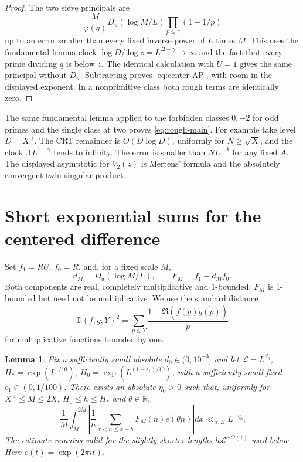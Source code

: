 \documentclass[11pt]{article}
\newtheorem{lemma}[theorem]{Lemma}
\theoremstyle{remark}\newtheorem{remark}[theorem]{Remark}
\newcommand{\calL}{\mathcal L}
\newcommand{\dist}{\mathbb D}
\begin{document}
\begin{proof}
The two sieve principals are
\[
 \frac{M}{\varphi(q)}D_u(\log M/L)
       \prod_{p\le z}(1-1/p)
\]
up to an error smaller than every fixed inverse power of $L$ times $M$.
This uses the fundamental-lemma clock
$\log D/\log z=L^{.2-\gamma}\to\infty$ and the fact that every prime
dividing $q$ is below $z$. The identical calculation with $U=1$ gives
the same principal without $D_u$. Subtracting proves
\eqref{eq:center-AP}, with room in the displayed exponent.
In a nonprimitive class both rough terms are identically zero.
\end{proof}

The same fundamental lemma applied to the forbidden classes $0,-2$
for odd primes and the single class at two proves
\eqref{eq:rough-main}. For example take level $D=X^{.1}$.
The CRT remainder is $O(D\log D)$, uniformly for $N\ge\sqrt X$, and
the clock $.1L^{1-\gamma}$ tends to infinity. The error is smaller than
$NL^{-A}$ for any fixed $A$. The displayed asymptotic for $V_2(z)$ is
Mertens' formula and the absolutely convergent twin singular product.

\section{Short exponential sums for the centered difference}
Set $f_1=RU$, $f_0=R$, and, for a fixed scale $M$,
\[
 d_M=D_u(\log M/L),\qquad F_M=f_1-d_M f_0.
\]
Both components are real, completely multiplicative and $1$-bounded;
$F_M$ is $1$-bounded but need not be multiplicative.
We use the standard distance
\[
 \dist(f,g;Y)^2=\sum_{p\le Y}\frac{1-\Re(f(p)\overline{g(p)})}{p}
\]
for multiplicative functions bounded by one.

\begin{lemma}\label{lem:short}
Fix a sufficiently small absolute $d_0\in(0,10^{-3}]$ and let
$\calL=L^{d_0}$,
$H_* =\exp(L^{1/10})$,
$H_0=\exp(L^{(1-\epsilon_1)/10})$, with a sufficiently small fixed
$\epsilon_1\in(0,1/100)$.
There exists an absolute $\eta_0>0$ such that, uniformly for
$X^{.4}\le M\le2X$, $H_0\le h\le H_*$ and $\theta\in\mathbb R$,
\begin{equation}\label{eq:short}
 \frac1M\int_M^{2M}
       \left|\frac1h\sum_{x<n\le x+h}F_M(n)e(\theta n)\right|dx
                         \ll_{\alpha,B}L^{-\eta_0}.
\end{equation}
The estimate remains valid for the slightly shorter lengths
$h\calL^{-O(1)}$ used below. Here $e(t)=\exp(2\pi it)$.
\end{lemma}
\end{document}
